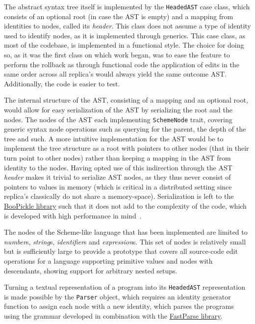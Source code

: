 The abstract syntax tree itself is implemented by the \texttt{HeadedAST} case class, which consists of an
optional root (in case the AST is empty) and a mapping from identities to nodes, called its \emph{header}.
This class does not assume a type of identity used to identify nodes, as it is implemented through generics.
This case class, as most of the codebase, is implemented in a functional style.
The choice for doing so, as it was the first class on which work began, was to ease the feature to perform the rollback
as through functional code the application of edits in the same order across all replica's would always yield the
same outcome AST.
Additionally, the code is easier to test.

The internal structure of the AST, consisting of a mapping and an optional root, would allow for easy serialization of
the AST by serializing the root and the nodes.
The nodes of the AST each implementing \texttt{SchemeNode} trait, covering generic syntax node operations
such as querying for the parent, the depth of the tree and such.
A more intuitive implementation for the AST would be to implement the tree structure as a root with pointers to other
nodes (that in their turn point to other nodes) rather than keeping a mapping in the AST from identity to the nodes.
Having opted use of this indirection through the AST \emph{header} makes it trivial to serialize AST nodes, as they
thus never consist of pointers to values in memory (which is critical in a distributed setting since replica's
classically do not share a memory-space).
Serialization is left to the \href{https://github.com/suzaku-io/boopickle}{BooPickle library} such that it does
not add to the complexity of the code, which is developed with high performance in mind~\cite{10.1145/2509136.2509547}.

The nodes of the Scheme-like language that has been implemented are limited to \emph{number}s, \emph{string}s,
\emph{identifier}s and \emph{expression}s.
This set of nodes is relatively small but is sufficiently large to provide a prototype that covers all source-code edit
operations for a language supporting primitive values and nodes with descendants, showing support for arbitrary nested
setups.

Turning a textual representation of a program into its \texttt{HeadedAST} representation is made possible
by the \texttt{Parser} object, which requires an identity generator function to assign each node with a new
identity, which parses the programs using the grammar developed in combination with the
\href{https://com-lihaoyi.github.io/fastparse/}{FastParse library}.

